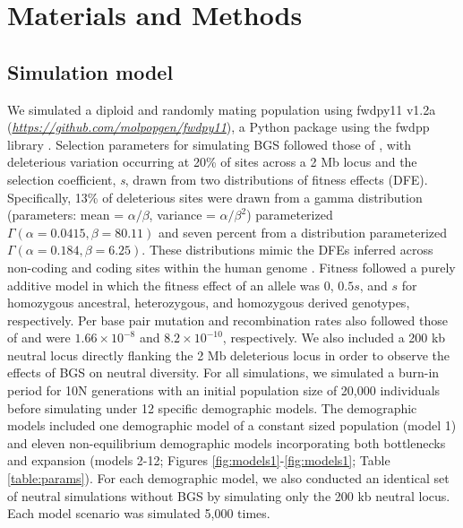 \documentclass[9pt,twocolumn,twoside]{rilabRxiv}
\begin{document}
\section{Materials and Methods}
\label{sec:materials:methods}

\subsection{Simulation model}

We simulated a diploid and randomly mating population using fwdpy11 v1.2a (\href{https://github.com/molpopgen/fwdpy11}{\emph{https://github.com/molpopgen/fwdpy11}}), a Python package using the fwdpp library \citep{thornton2014c++}.
Selection parameters for simulating BGS followed those of \citet{torres2018human}, with deleterious variation occurring at 20\% of sites across a 2 Mb locus and the selection coefficient, \textit{s}, drawn from two distributions of fitness effects (DFE).
Specifically, 13\% of deleterious sites were drawn from a gamma distribution (parameters: mean = $\alpha/\beta$, variance = $\alpha/\beta^2$) parameterized $\Gamma(\alpha = 0.0415, \beta = 80.11)$ and seven percent from a distribution parameterized $\Gamma(\alpha = 0.184, \beta = 6.25)$.
These distributions mimic the DFEs inferred across non-coding and coding sites within the human genome \citep{torgerson2009evolutionary, boyko2008assessing}.
Fitness followed a purely additive model in which the fitness effect of an allele was 0, $0.5s$, and $s$ for homozygous ancestral, heterozygous, and homozygous derived genotypes, respectively.
Per base pair mutation and recombination rates also followed those of \citet{torres2018human} and were $1.66 \times 10^{-8}$ and $8.2 \times 10^{-10}$, respectively.
We also included a 200 kb neutral locus directly flanking the 2 Mb deleterious locus in order to observe the effects of BGS on neutral diversity.
For all simulations, we simulated a burn-in period for 10N generations with an initial population size of 20,000 individuals before simulating under 12 specific demographic models.
The demographic models included one demographic model of a constant sized population (model 1) and eleven non-equilibrium demographic models incorporating both bottlenecks and expansion (models 2-12; Figures \ref{fig:models1}-\ref{fig:models1}; Table \ref{table:params}).
For each demographic model, we also conducted an identical set of neutral simulations without BGS by simulating only the 200 kb neutral locus.
Each model scenario was simulated 5,000 times.
\end{document}
